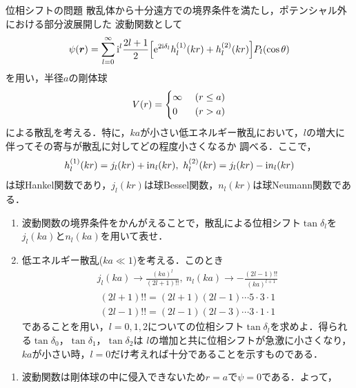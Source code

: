 \documentclass{report}
\begin{document}
  \begin{myex}{位相シフトの問題}{}
    散乱体から十分遠方での境界条件を満たし，ポテンシャル外における部分波展開した
    波動関数として
    \begin{align}
      \psi(\bm{r}) = \sum_{l=0}^{\infty} \mathrm{i}^l \frac{2l+1}{2}\qty[\mathrm{e}^{2\mathrm{i}\delta_l} h_l^{(1)} (kr) + h_l^{(2)} (kr)] P_l(\cos\theta)
    \end{align}
    を用い，半径$a$の剛体球
    \begin{align}
      V(r) = 
      \begin{dcases}
        \infty\ &(r\leq a) \\
        0\ &(r>a)
      \end{dcases}
    \end{align}
    による散乱を考える．特に，$ka$が小さい低エネルギー散乱において，$l$の増大に伴ってその寄与が散乱に対してどの程度小さくなるか
    調べる．ここで，
    \begin{align}
      h_l^{(1)}(kr) = j_l(kr) + \mathrm{i} n_l(kr),\ h_l^{(2)}(kr) = j_l(kr) - \mathrm{i} n_l(kr)
    \end{align}
    は球Hankel関数であり，$j_l(kr)$は球Bessel関数，$n_l(kr)$は球Neumann関数である．
    \begin{enumerate}
      \item 波動関数の境界条件をかんがえることで，散乱による位相シフト$\tan\delta_l$を$j_l(ka)$と$n_l(ka)$を用いて表せ．
      \item 低エネルギー散乱($ka \ll 1$)を考える．このとき
            \begin{align}
              \label{LimitOfBessel}
              j_l(ka) \to \frac{(ka)^l}{(2l+1)!!},\ n_l(ka) \to -\frac{(2l-1)!!}{(ka)^{l+1}}
            \end{align}
            \begin{align}
              (2l+1)!! = (2l+1)(2l-1)\cdots5\cdot3\cdot1 \\
              (2l-1)!! = (2l-1)(2l-3)\cdots3\cdot1\cdot1
            \end{align}
            であることを用い，$l=0,1,2$についての位相シフト$\tan\delta_l$を求めよ．得られる$\tan\delta_0$，$\tan\delta_1$，$\tan\delta_2$は
            $l$の増加と共に位相シフトが急激に小さくなり，$ka$が小さい時，$l=0$だけ考えれば十分であることを示すものである．
    \end{enumerate}
    \tcblower
    \begin{enumerate}
      \item 波動関数は剛体球の中に侵入できないため$r=a$で$\psi=0$である．よって，

\end{enumerate}
\end{myex}
\end{document}
